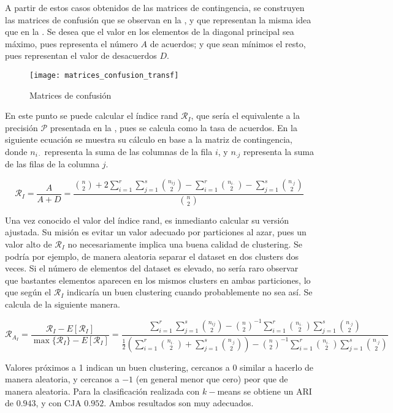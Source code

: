 					A partir de estos casos obtenidos de las matrices de contingencia, se construyen las matrices de confusión que se observan en la , y que representan la misma idea que en la . Se desea que el valor en los elementos de la diagonal principal sea máximo, pues representa el número $A$ de acuerdos; y que sean mínimos el resto, pues representan el valor de desacuerdos $D$. 
					
					\begin{figure}[!h]
						\centering
						\texttt{[image: matrices\_confusion\_transf]}
						\caption{Matrices de confusión}
						\label{fig:matrices_confusion_transf}
					\end{figure} 
					
					En este punto se puede calcular el índice rand $\mathcal{R}_I$, que sería el equivalente a la precisión $\mathcal{P}$ presentada en la , pues se calcula como la tasa de acuerdos. En la siguiente ecuación se muestra su cálculo en base a la matriz de contingencia, donde $n_{i\cdot}$ representa la suma de las columnas de la fila $i$, y $n_{\cdot j}$ representa la suma de las filas de la columna $j$. 
					
					$$
					\mathcal{R}_I = \frac{A}{A + D} = \frac{\displaystyle\binom{n}{2} + 2\sum_{i = 1}^r\sum_{j = 1}^s \binom{n_{ij}}{2} - \sum_{i = 1}^r \binom{n_{i\cdot}}{2} - \sum_{j = 1}^s \binom{n_{\cdot j}}{2}}{\displaystyle\binom{n}{2}}
					$$
					
					Una vez conocido el valor del índice rand, es inmedianto calcular su versión ajustada. Su misión es evitar un valor adecuado por particiones al azar, pues un valor alto de $\mathcal{R}_I$ no necesariamente implica una buena calidad de clustering. Se podría por ejemplo, de manera aleatoria separar el dataset en dos clusters dos veces. Si el número de elementos del dataset es elevado, no sería raro observar que bastantes elementos aparecen en los mismos clusters en ambas particiones, lo que según el $\mathcal{R}_I$ indicaría un buen clustering cuando probablemente no sea así. Se calcula de la siguiente manera. 
					
					$$
					\mathcal{R}_{A_I} = \frac{\mathcal{R}_{I} - E[\mathcal{R}_I]}{\max\{\mathcal{R}_I\} - E[\mathcal{R}_I]} = \frac{\displaystyle\sum_{i = 1}^r\sum_{j = 1}^s\binom{n_{ij}}{2} - \binom{n}{2}^{-1}\sum_{i = 1}^r\binom{n_{i\cdot}}{2}\sum_{j = 1}^s\binom{n_{\cdot j}}{2}}{\displaystyle\frac{1}{2}\left(\sum_{i = 1}^r \binom{n_{i\cdot}}{2} + \sum_{j = 1}^s \binom{n_{\cdot j}}{2}\right) - \binom{n}{2}^{-1}\sum_{i = 1}^r\binom{n_{i\cdot}}{2}\sum_{j = 1}^s\binom{n_{\cdot j}}{2}}
					$$
					
					Valores próximos a 1 indican un buen clustering, cercanos a 0 similar a hacerlo de manera aleatoria, y cercanos a $-1$ (en general menor que cero) peor que de manera aleatoria. Para la clasificación realizada con $k-$means se obtiene un ARI de $0.943$, y con CJA $0.952$. Ambos resultados son muy adecuados. 
				
